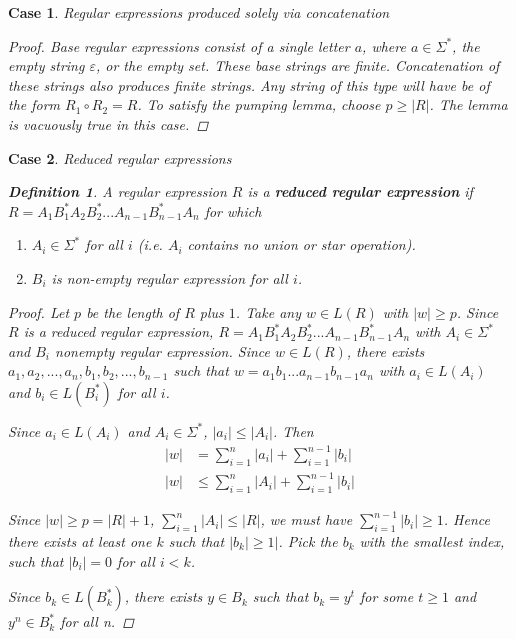 \documentclass[11pt]{article}
\newtheorem{case}{Case}
\theoremstyle{definition}
\newtheorem*{definition}{Definition}
\begin{document}
\begin{case} Regular expressions produced solely via concatenation
\begin{proof}
Base regular expressions consist of a single letter $a$, where $a \in \Sigma^*$, the empty string $\varepsilon$, or the empty set. These base strings are finite. Concatenation of these strings also produces finite strings. Any string of this type will have be of the form $R_1 \circ R_2 = R$. To satisfy the pumping lemma, choose $p \ge |R|$. The lemma is vacuously true in this case.
\end{proof}
\end{case}
\begin{case}
Reduced regular expressions

\begin{definition}
A regular expression $R$ is a \textbf{reduced regular expression} if $R = A_1B_1^*A_2B_2^*...A_{n-1}B_{n-1}^*A_n$ for which
\begin{enumerate}
    \item $A_i \in \Sigma^*$ for all $i$ (i.e. $A_i$ contains no union or star operation).
    \item $B_i$ is non-empty regular expression for all $i$.
\end{enumerate}
\end{definition}
\begin{proof}
Let $p$ be the length of $R$ plus $1$. Take any $w\in L(R)$ with $|w|\geq p$. Since $R$ is a reduced regular expression, $R = A_1B_1^*A_2B_2^*...A_{n-1}B_{n-1}^*A_n$ with $A_i \in \Sigma^*$ and $B_i$ nonempty regular expression. Since $w \in L(R)$, there exists $a_1, a_2, ... ,a_n, b_1, b_2, ...,b_{n-1}$ such that $w = a_1b_1 ... a_{n-1}b_{n-1}a_n$ with $a_i \in L(A_i)$ and $b_i\in L(B_i^*)$ for all $i$.

Since $a_i \in L(A_i)$ and $A_i \in \Sigma^*$, $|a_i| \leq |A_i|$. Then 
\begin{align*}
    |w| &= \sum_{i=1}^n{|a_i|} + \sum_{i=1}^{n-1}{|b_i|}\\
    |w| &\leq \sum_{i=1}^n{|A_i|} + \sum_{i=1}^{n-1}{|b_i|}
\end{align*}

Since $|w| \geq p = |R| + 1$, $\sum_{i=1}^n{|A_i|} \leq |R|$, we must have $\sum_{i=1}^{n-1}{|b_i|} \geq 1$. Hence there exists at least one $k$ such that $|b_k| \geq 1|$. Pick the $b_k$ with the smallest index, such that $|b_i| = 0$ for all $i < k$.

Since $b_k \in L(B_k^*)$, there exists $y\in B_k$ such that $b_k = y^t$ for some $t\geq 1$ and $y^n \in B_k ^*$ for all n. 


\end{proof}
\end{case}
\end{document}
